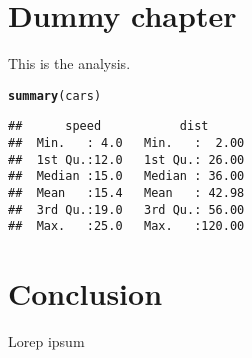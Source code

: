 \documentclass{ctuthesis}\usepackage[]{graphicx}\usepackage[]{color}
\makeatletter
\newcommand{\hlstd}[1]{\textcolor[rgb]{0.345,0.345,0.345}{#1}}%
\newcommand{\hlkwd}[1]{\textcolor[rgb]{0.737,0.353,0.396}{\textbf{#1}}}%
\newenvironment{kframe}{%
 \def\at@end@of@kframe{}%
 \ifinner\ifhmode%
  \def\at@end@of@kframe{\end{minipage}}%
  \begin{minipage}{\columnwidth}%
 \fi\fi%
 \def\FrameCommand##1{\hskip\@totalleftmargin \hskip-\fboxsep
 \colorbox{shadecolor}{##1}\hskip-\fboxsep
     \hskip-\linewidth \hskip-\@totalleftmargin \hskip\columnwidth}%
 \MakeFramed {\advance\hsize-\width
   \@totalleftmargin\z@ \linewidth\hsize
   \@setminipage}}%
 {\par\unskip\endMakeFramed%
 \at@end@of@kframe}
\newenvironment{knitrout}{}{} %
\makeatother
\begin{document}


\chapter{Dummy chapter}
This is the analysis.

\begin{knitrout}
\color{fgcolor}\begin{kframe}
\begin{alltt}
\hlkwd{summary}\hlstd{(cars)}
\end{alltt}
\begin{verbatim}
##      speed           dist       
##  Min.   : 4.0   Min.   :  2.00  
##  1st Qu.:12.0   1st Qu.: 26.00  
##  Median :15.0   Median : 36.00  
##  Mean   :15.4   Mean   : 42.98  
##  3rd Qu.:19.0   3rd Qu.: 56.00  
##  Max.   :25.0   Max.   :120.00
\end{verbatim}
\end{kframe}
\end{knitrout}
        
        
        
        \chapter{Conclusion}
        Lorep ipsum \cite{doe}
        
  
      
  
        \small
         
        
    
\end{document}
